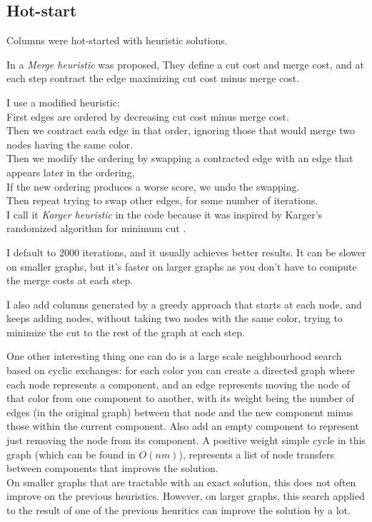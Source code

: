 \documentclass{article}
\begin{document}
\subsection{Hot-start}
\label{hotstart}
Columns were hot-started with heuristic solutions.

In \parencite{mop2012} a \textit{Merge heuristic} was proposed,
They define a cut cost and merge cost, and at each step contract the edge maximizing cut cost minus merge cost.

I use a modified heuristic:\\
First edges are ordered by decreasing cut cost minus merge cost.\\
Then we contract each edge in that order, ignoring those that would merge two nodes having the same color.\\
Then we modify the ordering by swapping a contracted edge with an edge that appears later in the ordering,\\
If the new ordering produces a worse score, we undo the swapping.\\
Then repeat trying to swap other edges, for some number of iterations.\\
I call it \textit{Karger heuristic} in the code because it was inspired by Karger's randomized algorithm for minimum cut \parencite{karger}.

I default to 2000 iterations, and it usually achieves better results.
It can be slower on smaller graphs, but it's faster on larger graphs as you don't have to compute the merge costs at each step.

I also add columns generated by a greedy approach that starts at each node,
and keeps adding nodes, without taking two nodes with the same color, trying to minimize the cut to the rest of the graph at each step.

One other interesting thing one can do is a large scale neighbourhood search based on cyclic exchanges:
for each color you can create a directed graph where each node represents a component,
and an edge represents moving the node of that color from one component to another,
with its weight being the number of edges (in the original graph) between that node and the new component minus those within the current component.
Also add an empty component to represent just removing the node from its component.
A positive weight simple cycle in this graph (which can be found in $O(nm)$),
represents a list of node transfers between components that improves the solution.\\
On smaller graphs that are tractable with an exact solution, this does not often improve on the previous heuristics.
However, on larger graphs, this search applied to the result of one of the previous heuritics can improve the solution by a lot.
\end{document}
